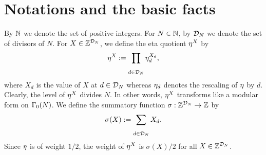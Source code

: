 \documentclass[a4paper,11pt]{amsart}
\begin{document}
\section{Notations and the basic facts}
\label{26.08.2015.1}
By $\mathbb{N}$ we denote the set of positive integers.
For $N\in\mathbb{N}$, by $\mathcal{D}_N$ we denote the set of divisors of $N$.
For %
$X\in\mathbb{Z}^{\mathcal{D}_N}$, we define the eta quotient $\eta^X$
   by
   \begin{equation}\label{3Jan15.1}
    \e^X:=\displaystyle{\prod_{\substack{\ \\\ \\d\in\D}}\eta_d^{X_d}},
 \end{equation}
where $X_d$ is the %
value of $X$ %
at $d\in\mathcal{D}_N$ whereas $\eta_d$ denotes the rescaling of $\eta$ by $d$.
Clearly, the level of $\eta^X$ divides $N$. In other words, $\eta^X$ transforms like a modular form on $\Gamma_0(N)$. 
We define the summatory function $\sigma:\mathbb{Z}^{\mathcal{D}_N}\rightarrow\mathbb{Z}$ by \begin{equation}
\sigma(X):=\sum_{\substack{\ \\\ \\d\in\mathcal{D}_N}}X_d.
\label{30.08.2015.A}\end{equation}
Since $\eta$ is of weight $1/2$,  %
the weight of $\eta^X$ is  $\sigma(X)/2$ for all $X\in\mathbb{Z}^{\mathcal{D}_N}$.
\end{document}
